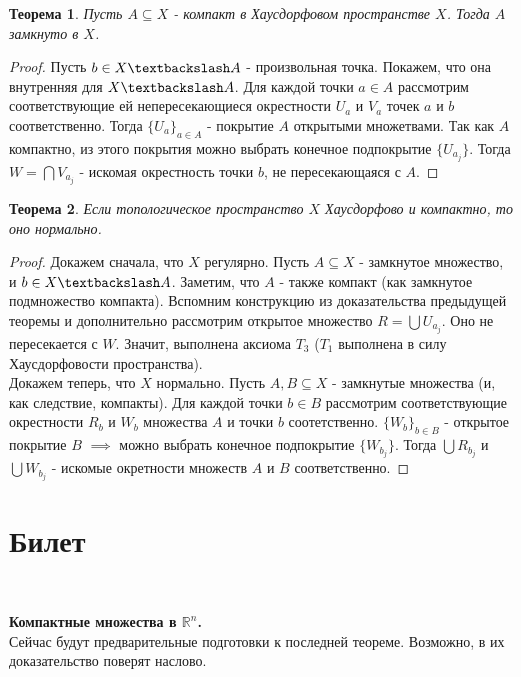 \documentclass[a4paper,100pt]{article}
\theoremstyle{indented}
\newtheorem{theorem}{Теорема}
\begin{document}
\begin{theorem}
    Пусть $A \subseteq X$ - компакт в Хаусдорфовом пространстве $X$. Тогда $A$ замкнуто в $X$.
    \end{theorem}
    \begin{proof}
    Пусть $b \in X \textbackslash A$ - произвольная точка. Покажем, что она внутренняя для $X \textbackslash A$. Для каждой точки $a \in A$ рассмотрим соответствующие ей непересекающиеся окрестности $U_a$ и $V_a$ точек $a$ и $b$ соответственно. Тогда $\{U_a\}_{a \in A}$ - покрытие $A$ открытыми множетвами. Так как $A$ компактно, из этого покрытия можно выбрать конечное подпокрытие $\{U_{a_j}\}$. Тогда $W=\bigcap V_{a_j}$ - искомая окрестность точки $b$, не пересекающаяся с $A$.
    \end{proof}
    \begin{theorem}
     Если топологическое пространство $X$ Хаусдорфово и компактно, то оно нормально.
    \end{theorem}
    \begin{proof}
     Докажем сначала, что $X$ регулярно. Пусть $A \subseteq X$ - замкнутое множество, и $b \in X \textbackslash A$. Заметим, что $A$ - также компакт (как замкнутое подмножество компакта). Вспомним конструкцию из доказательства предыдущей теоремы и дополнительно рассмотрим открытое множество $R=\bigcup U_{a_j}$. Оно не пересекается с $W$. Значит, выполнена аксиома $T_3$ ($T_1$ выполнена в силу Хаусдорфовости пространства).
     \\

     Докажем теперь, что $X$ нормально. Пусть $A, B \subseteq X$ - замкнутые множества (и, как следствие, компакты). Для каждой точки $b \in B$ рассмотрим соответствующие окрестности $R_b$ и $W_b$ множества $A$ и точки $b$ соотетственно. $\{W_b\}_{b \in B}$ - открытое покрытие $B$ $\implies$ можно выбрать конечное подпокрытие $\{W_{b_j}\}$. Тогда $\bigcup R_{b_j}$ и $\bigcup W_{b_j}$ - искомые окретности множеств $A$ и $B$ соответственно.
    \end{proof}

\section{Билет} \

\medskip

\textbf{Компактные множества в $\mathbb{R}^n$.}\\

Сейчас будут предварительные подготовки к последней теореме. Возможно, в их доказательство поверят наслово.\\
\end{document}
